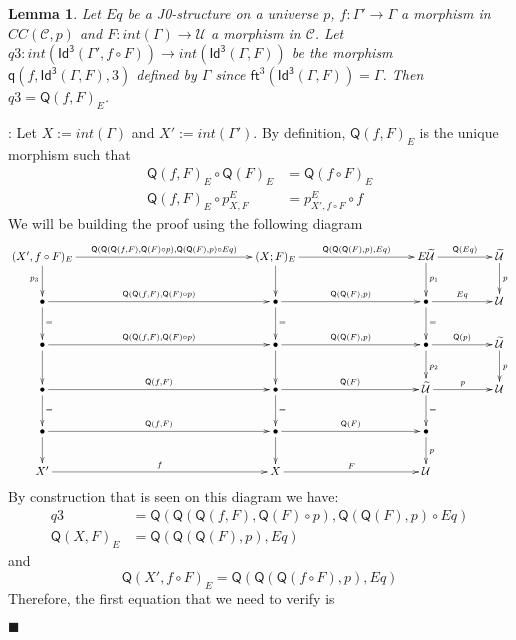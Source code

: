 \documentclass[12pt]{article}
\numberwithin{equation}{section}
\newenvironment{myproof}{{\bf Proof}:}{$\blacksquare$ \vskip 5mm }
\newtheorem{lemma}[proposition]{Lemma}
\newcommand{\llabel}[1]{\label{#1}}
\newcommand{\sr}{\rightarrow}
\newcommand{\wt}{\widetilde}
\newcommand{\BB}{{\bullet}}
\newcommand{\toCC}{CC} %
\newcommand{\ft}{\mathsf{ft}}
\newcommand{\q}{\mathsf{q}}
\newcommand{\Idx}{\mathsf{Id^3}} %
\newcommand{\U}{\mathcal{U}}
\newcommand{\Q}{\mathsf{Q}}
\begin{document}
\begin{lemma}
\llabel{2015.04.04.l4} Let $Eq$ be a J0-structure on a universe $p$,
$f:\Gamma'\sr \Gamma$ a morphism in $\toCC({\mathcal C},p)$ and $F:int(\Gamma)\sr
\U$ a morphism in $\mathcal C$.  Let $q3:int(\Idx(\Gamma',f\circ F))\sr
int(\Idx(\Gamma,F))$ be the morphism $\q(f,\Idx(\Gamma,F),3)$ defined by
$\Gamma$ since $\ft^3(\Idx(\Gamma,F))=\Gamma$. Then $q3=\Q(f,F)_{E}$.
\end{lemma}
%
\begin{myproof}
Let $X:=int(\Gamma)$ and $X':=int(\Gamma')$. By definition, $\Q(f,F)_{E}$ is the
unique morphism such that
%
\begin{align*}
  \Q(f,F)_{E}\circ \Q(F)_{E}&=\Q(f\circ F)_{E} \\
  \Q(f,F)_{E}\circ p^{E}_{X,F}&=p^{E}_{X',f\circ F}\circ f
\end{align*}
%
We will be building the proof using the following diagram
%
$$
\begin{xy}
          \xymatrix@C=4pc{ (X',f\circ F)_{E} \ar[rrr]^-{\Q(\Q(\Q(f,F),\Q(F)\circ
              p),\Q(\Q(F),p)\circ Eq)} \ar[d]_{p_3} &&& (X;F)_{E}
            \ar[rr]^-{\Q(\Q(\Q(F),p),Eq)} \ar[d] && E\wt{\U} \ar[r]^-{\Q(Eq)}
            \ar[d]^{p_1} & \wt{\U} \ar[d]^{p}\\ \BB
            \ar[rrr]^-{\Q(\Q(f,F),\Q(F)\circ p)} \ar[d]^{=} &&& \BB
            \ar[rr]^-{\Q(\Q(F),p)} \ar[d]^{=} && \BB \ar[r]^-{Eq} \ar[d]^{=}&
            \U\\ \BB \ar[rrr]^-{\Q(\Q(f,F),\Q(F)\circ p)} \ar[d] &&& \BB
            \ar[rr]^-{\Q(\Q(F),p)} \ar[d] && \BB \ar[r]^-{\Q(p)} \ar[d]^{p_2}&
            \wt{\U} \ar[d]^{p}\\ \BB \ar[rrr]^-{\Q(f,F)} \ar[d]^{=}&&& \BB
            \ar[rr]^-{\Q(F)} \ar[d]^{=} && \wt{\U} \ar[r]^-{p} \ar[d]^{=} & \U
            \\ \BB \ar[rrr]^-{\Q(f,F)} \ar[d] &&& \BB \ar[rr]^-{\Q(F)} \ar[d] &&
            \BB \ar[d]^{p}\\ X' \ar[rrr]^-{f} &&& X \ar[rr]^-{F} && \U }
\end{xy}
$$
%
By construction that is seen on this diagram we have:
%
\begin{align*}
  q3&=\Q(\Q(\Q(f,F),\Q(F)\circ p),\Q(\Q(F),p)\circ Eq) \\
  \Q(X,F)_{E}&=\Q(\Q(\Q(F),p),Eq)
\end{align*}
%
and
%
$$\Q(X', f\circ F)_{E}=\Q(\Q(\Q(f\circ F),p),Eq)$$
%
Therefore, the first equation that we need to verify is

\end{myproof}
\end{document}
